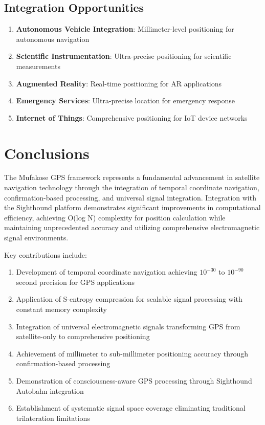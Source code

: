\documentclass[12pt,a4paper]{article}
\begin{document}
\subsection{Integration Opportunities}

\begin{enumerate}
\item \textbf{Autonomous Vehicle Integration}: Millimeter-level positioning for autonomous navigation
\item \textbf{Scientific Instrumentation}: Ultra-precise positioning for scientific measurements
\item \textbf{Augmented Reality}: Real-time positioning for AR applications
\item \textbf{Emergency Services}: Ultra-precise location for emergency response
\item \textbf{Internet of Things}: Comprehensive positioning for IoT device networks
\end{enumerate}

\section{Conclusions}

The Mufakose GPS framework represents a fundamental advancement in satellite navigation technology through the integration of temporal coordinate navigation, confirmation-based processing, and universal signal integration. Integration with the Sighthound platform demonstrates significant improvements in computational efficiency, achieving O(log N) complexity for position calculation while maintaining unprecedented accuracy and utilizing comprehensive electromagnetic signal environments.

Key contributions include:

\begin{enumerate}
\item Development of temporal coordinate navigation achieving $10^{-30}$ to $10^{-90}$ second precision for GPS applications
\item Application of S-entropy compression for scalable signal processing with constant memory complexity
\item Integration of universal electromagnetic signals transforming GPS from satellite-only to comprehensive positioning
\item Achievement of millimeter to sub-millimeter positioning accuracy through confirmation-based processing
\item Demonstration of consciousness-aware GPS processing through Sighthound Autobahn integration
\item Establishment of systematic signal space coverage eliminating traditional trilateration limitations
\end{enumerate}
\end{document}
